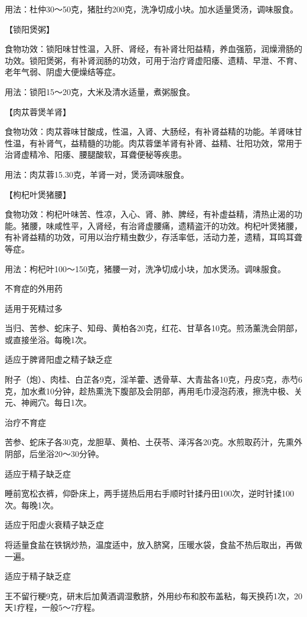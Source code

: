 \documentclass[12pt,UTF8,openany]{ctexbook}
\begin{document}
用法：杜仲30～50克，猪肚约200克，洗净切成小块。加水适量煲汤，调味服食。

【锁阳煲粥】

食物功效：锁阳味甘性温，入肝、肾经，有补肾壮阳益精，养血强筋，润燥滑肠的功效。锁阳煲粥，有补肾润肠的功效，可用于治疗肾虚阳痿、遗精、早泄、不育、老年气弱、阴虚大便燥结等症。

用法：锁阳15～20克，大米及清水适量，煮粥服食。

【肉苁蓉煲羊肾】

食物功效：肉苁蓉味甘酸成，性温，入肾、大肠经，有补肾益精的功能。羊肾味甘性温，有补肾气，益精髓的功能。肉苁蓉堡羊肾有补肾、益精、壮阳功效，常用于治肾虚精冷、阳痿、腰腿酸软，耳聋便秘等疾患。

用法：肉苁蓉15.30克，羊肾一对，煲汤调味服食。

【枸杞叶煲猪腰】

食物功效：枸杞叶味苦、性凉，入心、肾、肺、脾经，有补虚益精，清热止渴的功能。猪腰，味咸性平，入肾经，有治肾虚腰痛，遗精盗汗的功效。枸杞叶煲猪腰，有补肾益精的功效，可用以治疗精虫数少，存活率低，活动力差，遗精，耳鸣耳聋等症。

用法：枸杞叶100～150克，猪腰一对，洗净切成小块，加水煲汤。调味服食。





不育症的外用药


适用于死精过多

当归、苦参、蛇床子、知母、黄柏各20克，红花、甘草各10克。煎汤薰洗会阴部，或直接坐浴。每晚1次。

适应于脾肾阳虚之精子缺乏症

附子（炮）、肉桂、白芷各9克，淫羊藿、透骨草、大青盐各10克，丹皮5克，赤芍6克，加水煮10分钟，趁热熏洗下腹部及会阴部，再用毛巾浸泡药液，擦洗中极、关元、神阙穴。每日1次。

治疗不育症

苦参、蛇床子各30克，龙胆草、黄柏、土茯苓、泽泻各20克。水煎取药汁，先熏外阴部，后坐浴20～30分钟。

适应于精子缺乏症

睡前宽松衣裤，仰卧床上，两手搓热后用右手顺时针揉丹田100次，逆时针揉100次。每晚1次。

适应于阳虚火衰精子缺乏症

将适量食盐在铁锅炒热，温度适中，放入脐窝，压暖水袋，食盐不热后取出，再做一遍。

适应于精子缺乏症

王不留行粳9克，研末后加黄酒调湿敷脐，外用纱布和胶布盖粘，每天换药1次，20天1疗程，一般5～7疗程。
\end{document}
